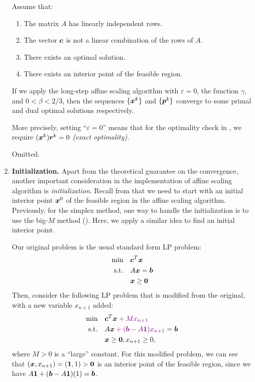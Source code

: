 \begin{enumerate}
\begin{theorem}
\label{thm:affine-scal-conv}
Assume that:
\begin{enumerate}
\item The matrix \(A\) has linearly independent rows.
\item The vector \(\bm{c}\) is not a linear combination of the rows of \(A\).
\item There exists an optimal solution.
\item There exists an interior point of the feasible region.
\end{enumerate}
If we apply the long-step affine scaling algorithm with \(\varepsilon=0\),
the function \(\gamma\), and \(0<\beta<2/3\), then the sequences
\(\{\bm{x}^{k}\}\) and \(\{\bm{p}^{k}\}\) converge to some primal and dual
optimal solutions respectively.

\begin{note}
More precisely, setting ``\(\varepsilon=0\)'' means that for the optimality check
in , we require \((\bm{x}^{k})\bm{r}^{k}=0\)
\emph{(exact optimality)}.
\end{note}
\end{theorem}
\begin{pf}
Omitted.
\end{pf}
\item \textbf{Initialization.} Apart from the theoretical guarantee on the
convergence, another important consideration in the implementation of affine
scaling algorithm is \emph{initialization}. Recall from
 that we need to start with an initial interior
point \(\bm{x}^{0}\) of the feasible region in the affine scaling algorithm.
Previously, for the simplex method, one way to
handle the initialization is to use the big-\(M\) method
(). Here, we apply a similar idea to find an initial
interior point.

Our original problem is the usual standard form LP problem:
\begin{align*}
\text{min}\quad&\bm{c}^{T}\bm{x} \\
\text{s.t.}\quad&A\bm{x}=\bm{b} \\
&\bm{x}\ge \bm{0}
\end{align*}
Then, consider the following LP problem that is modified from the original,
with a new variable \(x_{n+1}\) added:
\begin{align*}
\text{min}\quad&\vect{c}^{T}\vect{x}\vc{+Mx_{n+1}} \\
\text{s.t.}\quad&A\vect{x}\vc{+(\vect{b}-A\vect{1})x_{n+1}}=\vect{b} \\
&\vect{x}\ge \vect{0}, x_{n+1}\ge 0,
\end{align*}
where \(M>0\) is a ``large'' constant. For this modified problem, we can see
that \((\bm{x},x_{n+1})=(\bm{1},1)>\bm{0}\) is an interior point of the
feasible region, since we have \(A\bm{1}+(\bm{b}-A\bm{1})(1)=\bm{b}\).


\end{enumerate}
